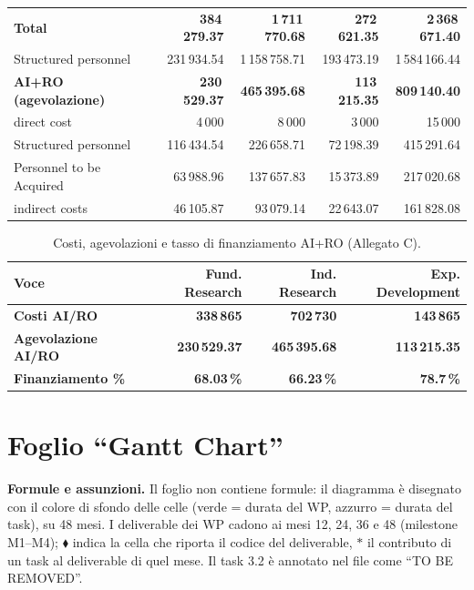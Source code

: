 \documentclass{plan4ari_report}
\begin{document}
\begin{table}[H]
\begin{tabular}{lrrrr}
\midrule
\textbf{Total} & \textbf{384\,279.37} & \textbf{1\,711\,770.68} & \textbf{272\,621.35} & \textbf{2\,368\,671.40} \\
\quad Structured personnel & 231\,934.54 & 1\,158\,758.71 & 193\,473.19 & 1\,584\,166.44 \\
\textbf{AI+RO (agevolazione)} & \textbf{230\,529.37} & \textbf{465\,395.68} & \textbf{113\,215.35} & \textbf{809\,140.40} \\
\quad direct cost & 4\,000 & 8\,000 & 3\,000 & 15\,000 \\
\quad Structured personnel & 116\,434.54 & 226\,658.71 & 72\,198.39 & 415\,291.64 \\
\quad Personnel to be Acquired & 63\,988.96 & 137\,657.83 & 15\,373.89 & 217\,020.68 \\
\quad indirect costs & 46\,105.87 & 93\,079.14 & 22\,643.07 & 161\,828.08 \\
\bottomrule\end{tabular}
\end{table}



\begin{table}[H]\centering\small
\caption{Costi, agevolazioni e tasso di finanziamento AI+RO (Allegato C).}\label{tab:acc-phi}
\begin{tabular}{lrrr}\toprule
\textbf{Voce} & \textbf{Fund. Research} & \textbf{Ind. Research} & \textbf{Exp. Development} \\\midrule
\textbf{Costi AI/RO} & \textbf{338\,865} & \textbf{702\,730} & \textbf{143\,865} \\
\textbf{Agevolazione AI/RO} & \textbf{230\,529.37} & \textbf{465\,395.68} & \textbf{113\,215.35} \\
\textbf{Finanziamento \%} & \textbf{68.03\,\%} & \textbf{66.23\,\%} & \textbf{78.7\,\%} \\
\bottomrule\end{tabular}
\end{table}



\section{Foglio ``Gantt Chart''}
\textbf{Formule e assunzioni.} Il foglio non contiene formule: il diagramma \`e disegnato con il colore di sfondo delle celle (verde = durata del WP, azzurro = durata del task), su 48 mesi. I deliverable dei WP cadono ai mesi 12, 24, 36 e 48 (milestone M1--M4); $\blacklozenge$ indica la cella che riporta il codice del deliverable, $\ast$ il contributo di un task al deliverable di quel mese. Il task 3.2 \`e annotato nel file come ``TO BE REMOVED''.
\end{document}
